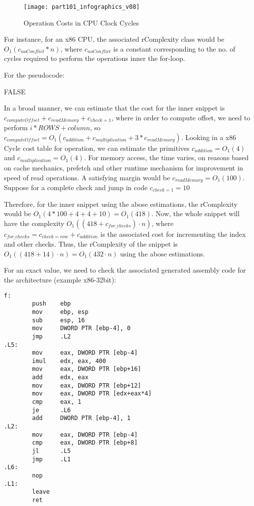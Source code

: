\begin{figure}[H]
\centering
\texttt{[image: part101\_infographics\_v08]}
\caption{Operation Costs in CPU Clock Cycles\cite{archcost}}
\end{figure}

For instance, for an x86 CPU, the associated rComplexity class would be
$ O_{1}(c_{noConflict} * n) $, where $c_{noConflict}$ is a constant corresponding to the no. of cycles required to perform the operations inner the for-loop.

For the pseudocode:
\begin{algorithmic}[1]
			\State \Return FALSE
		\EndIf
	\EndFor
\end{algorithmic}
In a broad manner, we can estimate that the cost for the inner snippet is $c_{computeOffset} + c_{readMemory} + c_{check=1}$, where in order to compute offset, we need to perform $i * ROWS + column$, so
$ c_{computeOffset} = O_{1}(c_{addition} + c_{multiplication} + 3 * c_{readMemory})$.
Looking in a x86 Cycle cost table for operation, we can estimate the primitives $c_{addition} = O_{1}(4)$ and $c_{multiplication} = O_{1}(4)$. For memory access, the time varies, on reasons based on cache mechanics, prefetch and other runtime mechanism for improvement in speed of read operations. A satisfying margin would be $c_{readMemory} = O_{1}(100)$. 
Suppose for a complete check and jump in code $c_{check=1} = 10$

Therefore, for the inner snippet using the abose estimations, the rComplexity would be $O_{1}(4 * 100 + 4 + 4 + 10) = O_{1}(418)$. Now, the whole snippet will have the complexity $O_{1}((418 + c_{for\_checks}) \cdot n)$, where  $c_{for\_checks} = c_{check=row} + c_{addition}$ is the associated cost for incrementing the index and other checks. Thus, the rComplexity of the snippet is $O_{1}((418 + 14) \cdot n) = O_{1}(432 \cdot n)$ using the abose estimations.

 
For an exact value, we need to check the associated generated assembly code for the architecture (example x86-32bit):
\begin{verbatim}
f:
        push    ebp
        mov     ebp, esp
        sub     esp, 16
        mov     DWORD PTR [ebp-4], 0
        jmp     .L2
.L5:
        mov     eax, DWORD PTR [ebp-4]
        imul    edx, eax, 400
        mov     eax, DWORD PTR [ebp+16]
        add     edx, eax
        mov     eax, DWORD PTR [ebp+12]
        mov     eax, DWORD PTR [edx+eax*4]
        cmp     eax, 1
        je      .L6
        add     DWORD PTR [ebp-4], 1
.L2:
        mov     eax, DWORD PTR [ebp-4]
        cmp     eax, DWORD PTR [ebp+8]
        jl      .L5
        jmp     .L1
.L6:
        nop
.L1:
        leave
        ret  
\end{verbatim}



